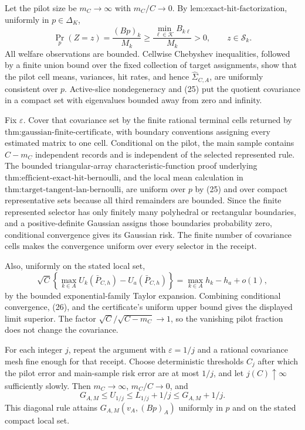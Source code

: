Let the pilot size be \(m_C\to\infty\) with \(m_C/C\to0\).  By \(\text{lem:exact-hit-factorization}\), uniformly in \(p\in\Delta_K\),
\[
\Pr_p(Z=z)=\frac{(Bp)_k}{M_k}\geq
\frac{\min_{\ell\in\mathcal K}B_{k\ell}}{M_k}>0,
\qquad z\in\mathcal S_k. \tag{25}
\]
All welfare observations are bounded.  Cellwise Chebyshev inequalities, followed by a finite union bound over the fixed collection of target assignments, show that the pilot cell means, variances, hit rates, and hence \(\widehat\Sigma_{C,A}\), are uniformly consistent over \(p\).  Active-slice nondegeneracy and (25) put the quotient covariance in a compact set with eigenvalues bounded away from zero and infinity.

Fix \(\varepsilon\).  Cover that covariance set by the finite rational terminal cells returned by \(\text{thm:gaussian-finite-certificate}\), with boundary conventions assigning every estimated matrix to one cell.  Conditional on the pilot, the main sample contains \(C-m_C\) independent records and is independent of the selected represented rule.  The bounded triangular-array characteristic-function proof underlying \(\text{thm:efficient-exact-hit-bernoulli}\), and the local mean calculation in \(\text{thm:target-tangent-lan-bernoulli}\), are uniform over \(p\) by (25) and over compact representative sets because all third remainders are bounded.  Since the finite represented selector has only finitely many polyhedral or rectangular boundaries, and a positive-definite Gaussian assigns those boundaries probability zero, conditional convergence gives its Gaussian risk.  The finite number of covariance cells makes the convergence uniform over every selector in the receipt.

Also, uniformly on the stated local set,
\[
\sqrt C\left\{\max_{k\in A}U_k(\bar P_{C,h})-U_a(\bar P_{C,h})\right\}
=\max_{k\in A}h_k-h_a+o(1), \tag{26}
\]
by the bounded exponential-family Taylor expansion.  Combining conditional convergence, (26), and the certificate's uniform upper bound gives the displayed limit superior.  The factor \(\sqrt C/\sqrt{C-m_C}\to1\), so the vanishing pilot fraction does not change the covariance.

For each integer \(j\), repeat the argument with \(\varepsilon=1/j\) and a rational covariance mesh fine enough for that receipt.  Choose deterministic thresholds \(C_j\) after which the pilot error and main-sample risk error are at most \(1/j\), and let \(j(C)\uparrow\infty\) sufficiently slowly.  Then \(m_C\to\infty\), \(m_C/C\to0\), and
\[
G_{A,M}\leq U_{1/j}\leq L_{1/j}+1/j\leq G_{A,M}+1/j.
\]
This diagonal rule attains \(G_{A,M}(v_A,(Bp)_A)\) uniformly in \(p\) and on the stated compact local set.